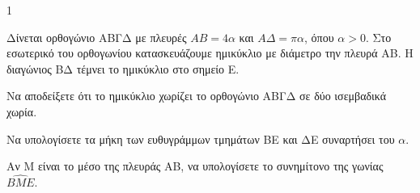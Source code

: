 \begin{ylh}{1}
    \item [Ύλη από εικόνα]
\end{ylh}
\begin{figure}
\centering
{}
\end{figure}
Δίνεται ορθογώνιο ΑΒΓΔ με πλευρές $ΑΒ = 4\alpha$ και $ΑΔ = \pi\alpha$, όπου $\alpha > 0$. Στο εσωτερικό του ορθογωνίου κατασκευάζουμε ημικύκλιο με διάμετρο την πλευρά ΑΒ. Η διαγώνιος ΒΔ τέμνει το ημικύκλιο στο σημείο Ε.
\begin{alist}
    \item Να αποδείξετε ότι το ημικύκλιο χωρίζει το ορθογώνιο ΑΒΓΔ σε δύο ισεμβαδικά χωρία. 
    \item Να υπολογίσετε τα μήκη των ευθυγράμμων τμημάτων ΒΕ και ΔΕ συναρτήσει του $\alpha$. 
    \item Αν Μ είναι το μέσο της πλευράς ΑΒ, να υπολογίσετε το συνημίτονο της γωνίας $\widehat{BME}$. 
\end{alist}